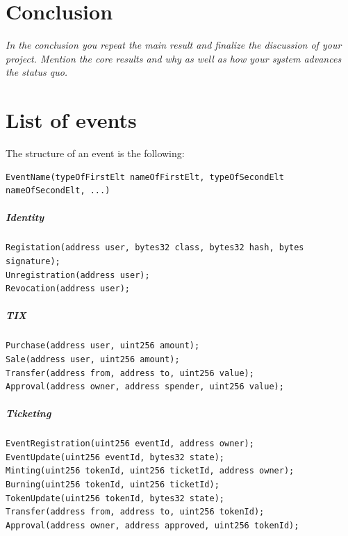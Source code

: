 \documentclass[a4paper,11pt,oneside]{report}
\begin{document}
\chapter{Conclusion}

\textit{In the conclusion you repeat the main result and finalize the discussion of
your project. Mention the core results and why as well as how your system
advances the status quo.} \\

\cleardoublepage
{}
{}
\nocite{*}
\printbibliography

\appendix
\chapter{List of events}
\label{sec:appendix_a}

The structure of an event is the following: 
\begin{verbatim}
EventName(typeOfFirstElt nameOfFirstElt, typeOfSecondElt nameOfSecondElt, ...)
\end{verbatim}



\paragraph{Identity}
\begin{verbatim}
Registation(address user, bytes32 class, bytes32 hash, bytes signature);
Unregistration(address user);
Revocation(address user);
\end{verbatim}

\paragraph{TIX}
\begin{verbatim}
Purchase(address user, uint256 amount);
Sale(address user, uint256 amount);
Transfer(address from, address to, uint256 value);
Approval(address owner, address spender, uint256 value);
\end{verbatim}

\paragraph{Ticketing}
\begin{verbatim}
EventRegistration(uint256 eventId, address owner);
EventUpdate(uint256 eventId, bytes32 state);
Minting(uint256 tokenId, uint256 ticketId, address owner);
Burning(uint256 tokenId, uint256 ticketId);
TokenUpdate(uint256 tokenId, bytes32 state);
Transfer(address from, address to, uint256 tokenId);
Approval(address owner, address approved, uint256 tokenId);
\end{verbatim}
\end{document}
